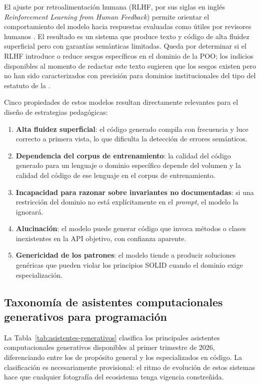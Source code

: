El ajuste por retroalimentación humana ({\small RLHF}, por sus siglas en inglés
\textit{Reinforcement Learning from Human Feedback}) permite orientar el
comportamiento del modelo hacia respuestas evaluadas como útiles por revisores
humanos \parencite{Fowler2018}. El resultado es un sistema que produce texto y código de alta fluidez
superficial pero con garantías semánticas limitadas. Queda por determinar si
el RLHF introduce o reduce sesgos específicos en el dominio de la POO; los
indicios disponibles al momento de redactar este texto sugieren que los sesgos
existen pero no han sido caracterizados con precisión para dominios institucionales
del tipo del estatuto de la \ud.

Cinco propiedades de estos modelos resultan directamente relevantes para el
diseño de estrategias pedagógicas:

\begin{enumerate}[label=\arabic*.]
  \item \textbf{Alta fluidez superficial}: el código generado compila con
        frecuencia y luce correcto a primera vista, lo que dificulta
        la detección de errores semánticos.
  \item \textbf{Dependencia del corpus de entrenamiento}: la calidad del
        código generado para un lenguaje o dominio específico depende
        del volumen y la calidad del código de ese lenguaje en el corpus
        de entrenamiento.
  \item \textbf{Incapacidad para razonar sobre invariantes no documentadas}:
        si una restricción del dominio no está explícitamente en el
        \textit{prompt}, el modelo la ignorará.
  \item \textbf{Alucinación}: el modelo puede generar código que invoca
        métodos o clases inexistentes en la API objetivo, con
        confianza aparente.
  \item \textbf{Genericidad de los patrones}: el modelo tiende a producir
        soluciones genéricas que pueden violar los principios SOLID
        cuando el dominio exige especialización.
\end{enumerate}

\subsection{Taxonomía de asistentes computacionales generativos para programación}
\label{subsec:taxonomia-asistentes}

La Tabla~\ref{tab:asistentes-generativos} clasifica los principales asistentes
computacionales generativos disponibles al primer trimestre de 2026, diferenciando
entre los de propósito general y los especializados en código. La clasificación es
necesariamente provisional: el ritmo de evolución de estos sistemas hace que
cualquier fotografía del ecosistema tenga vigencia constreñida.

